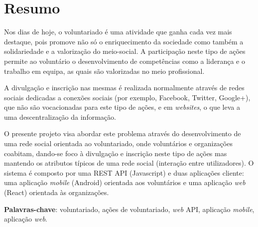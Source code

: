 \section*{Resumo}
Nos dias de hoje, o voluntariado é uma atividade que ganha cada vez mais destaque, pois promove não só o enriquecimento da sociedade como também a solidariedade e a valorização do meio-social. A participação neste tipo de ações permite ao voluntário o desenvolvimento de competências como a liderança e o trabalho em equipa, as quais são valorizadas no meio profissional. \par \smallskip
A divulgação e inscrição nas mesmas é realizada normalmente através de redes sociais dedicadas a conexões sociais (por exemplo, Facebook, Twitter, Google+), que  não são vocacionadas para este tipo de ações, e em \textit{websites}, o que leva a uma descentralização da informação. \par \smallskip
O presente projeto visa abordar este problema através do desenvolvimento de uma rede social orientada ao voluntariado, onde voluntários e organizações coabitam, dando-se foco à divulgação e inscrição neste tipo de ações mas mantendo os atributos típicos de uma rede social (interação entre utilizadores). O sistema é composto por uma REST API (Javascript) e duas aplicações cliente: uma aplicação \textit{mobile} (Android) orientada aos voluntários e uma aplicação \textit{web} (React) orientada às organizações. \par \smallskip
\textbf{Palavras-chave}: voluntariado, ações de voluntariado, \textit{web} API, aplicação \textit{mobile}, aplicação \textit{web}.